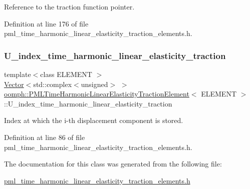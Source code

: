 Reference to the traction function pointer. 



Definition at line 176 of file pml\+\_\+time\+\_\+harmonic\+\_\+linear\+\_\+elasticity\+\_\+traction\+\_\+elements.\+h.

\mbox{\label{classoomph_1_1PMLTimeHarmonicLinearElasticityTractionElement_a8fd99f484eb4629b4ae7d3d76e0a95ec}} 
\subsubsection{\texorpdfstring{U\+\_\+index\+\_\+time\+\_\+harmonic\+\_\+linear\+\_\+elasticity\+\_\+traction}{U\_index\_time\_harmonic\_linear\_elasticity\_traction}}
{\footnotesize\ttfamily template$<$class E\+L\+E\+M\+E\+NT $>$ \\
\hyperlink{classoomph_1_1Vector}{Vector}$<$std\+::complex$<$unsigned$>$ $>$ \hyperlink{classoomph_1_1PMLTimeHarmonicLinearElasticityTractionElement}{oomph\+::\+P\+M\+L\+Time\+Harmonic\+Linear\+Elasticity\+Traction\+Element}$<$ E\+L\+E\+M\+E\+NT $>$\+::U\+\_\+index\+\_\+time\+\_\+harmonic\+\_\+linear\+\_\+elasticity\+\_\+traction\hspace{0.3cm}{\ttfamily [protected]}}



Index at which the i-\/th displacement component is stored. 



Definition at line 86 of file pml\+\_\+time\+\_\+harmonic\+\_\+linear\+\_\+elasticity\+\_\+traction\+\_\+elements.\+h.



The documentation for this class was generated from the following file\+:\begin{DoxyCompactItemize}
\item 
\hyperlink{pml__time__harmonic__linear__elasticity__traction__elements_8h}{pml\+\_\+time\+\_\+harmonic\+\_\+linear\+\_\+elasticity\+\_\+traction\+\_\+elements.\+h}\end{DoxyCompactItemize}
